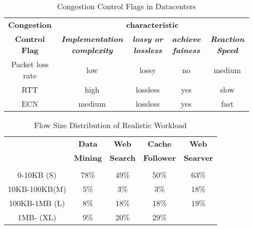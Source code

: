 \documentclass[conference]{IEEEtran}
\begin{document}

\begin{table*}[!t]
\caption{Congestion Control Flags in Datacenters }
\begin{center}
\begin{tabular}{|c|c|c|c|c|}
\hline
\textbf{Congestion }&\multicolumn{4}{|c|}{\textbf{characteristic}} \\
\cline{2-5}
\textbf{Control Flag} & \textbf{\textit{Implementation complexity}}& \textbf{\textit{lossy or lossless}}& \textbf{\textit{achieve fainess}} & \textbf{\textit{Reaction Speed}}\\
\hline
Packet loss rate& low&lossy & no& medium \\
\hline
RTT& high& lossless& yes& slow \\
\hline
ECN& medium& lossless& yes& fast \\
\hline
\end{tabular}
\label{tab1}
\end{center}
\end{table*}

\begin{table}[!t]
\renewcommand{\arraystretch}{1.3}
\caption{Flow Size Distribution of Realistic Workload}
\label{table_example}
\centering
\begin{tabular}{c||c|c|c|c}
\hline
\bfseries  & \bfseries Data  & \bfseries Web  & \bfseries Cache  & \bfseries Web \\
\bfseries  & \bfseries Mining  & \bfseries Search  & \bfseries Follower  & \bfseries Searver \\
\bfseries  & \bfseries \cite{b1} & \bfseries \cite{b1} & \bfseries  \cite{b2} & \bfseries \cite{b3}\\
\hline\hline
0-10KB    (S) & 78\% & 49\% & 50\% &63\%\\
\hline
10KB-100KB(M) &  5\% & 3\%  & 3\% & 18\%\\
\hline
100KB-1MB (L) & 8\% & 18\% & 18\% & 19\%\\
\hline
1MB-      (XL)& 9\% & 20\% & 29\% &   \\
\hline
\end{tabular}
\end{table}
\end{document}
